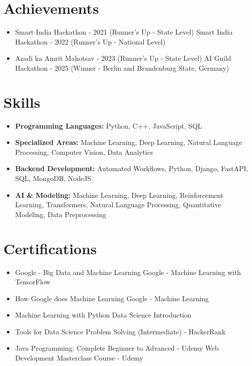 \documentclass[a4paper,10pt]{article}
\begin{document}
\section*{Achievements}
\begin{itemize}
\item Smart India Hackathon - 2021 (Runner's Up - State Level) \hfill Smart India Hackathon - 2022 (Runner's Up - National Level)
\item Azadi ka Amrit Mahotsav - 2023 (Runner's Up - State Level) \hfill AI Guild Hackathon - 2025 (Winner - Berlin and Brandenburg State, Germany)
\end{itemize}

\section*{Skills}
\begin{itemize}
  \item \textbf{Programming Languages:} Python, C++, JavaScript, SQL
  \item \textbf{Specialized Areas:} Machine Learning, Deep Learning, Natural Language Processing, Computer Vision, Data Analytics
  \item \textbf{Backend Development:} Automated Workflows, Python, Django, FastAPI, SQL, MongoDB, NodeJS
  \item \textbf{AI \& Modeling:} Machine Learning, Deep Learning, Reinforcement Learning, Transformers, Natural Language Processing, Quantitative Modeling, Data Preprocessing
\end{itemize}

\section*{Certifications}
\begin{itemize}
\item Google - Big Data and Machine Learning \hfill Google - Machine Learning with TensorFlow
\item How Google does Machine Learning \hfill Google - Machine Learning
\item Machine Learning with Python \hfill Data Science Introduction
\item Tools for Data Science \hfill Problem Solving (Intermediate) - HackerRank
\item Java Programming: Complete Beginner to Advanced - Udemy \hfill Web Development Masterclass Course - Udemy
\end{itemize}
\end{document}
